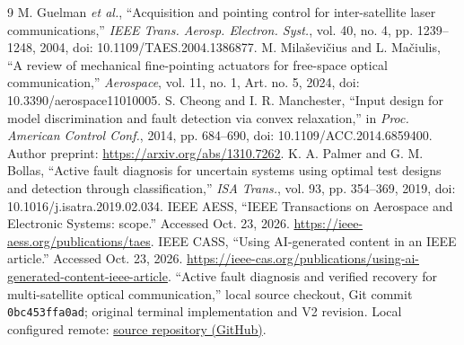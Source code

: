 \documentclass[journal]{IEEEtran}
\begin{document}
\begin{thebibliography}{9}
 M. Guelman \emph{et al.}, ``Acquisition and pointing control for inter-satellite laser communications,'' \emph{IEEE Trans. Aerosp. Electron. Syst.}, vol. 40, no. 4, pp. 1239--1248, 2004, doi: 10.1109/TAES.2004.1386877.
 M. Mila\v{s}evi\v{c}ius and L. Ma\v{c}iulis, ``A review of mechanical fine-pointing actuators for free-space optical communication,'' \emph{Aerospace}, vol. 11, no. 1, Art. no. 5, 2024, doi: 10.3390/aerospace11010005.
 S. Cheong and I. R. Manchester, ``Input design for model discrimination and fault detection via convex relaxation,'' in \emph{Proc. American Control Conf.}, 2014, pp. 684--690, doi: 10.1109/ACC.2014.6859400. Author preprint: \url{https://arxiv.org/abs/1310.7262}.
 K. A. Palmer and G. M. Bollas, ``Active fault diagnosis for uncertain systems using optimal test designs and detection through classification,'' \emph{ISA Trans.}, vol. 93, pp. 354--369, 2019, doi: 10.1016/j.isatra.2019.02.034.
 IEEE AESS, ``IEEE Transactions on Aerospace and Electronic Systems: scope.'' Accessed Oct. 23, 2026. \url{https://ieee-aess.org/publications/taes}.
 IEEE CASS, ``Using AI-generated content in an IEEE article.'' Accessed Oct. 23, 2026. \url{https://ieee-cas.org/publications/using-ai-generated-content-ieee-article}.
 ``Active fault diagnosis and verified recovery for multi-satellite optical communication,'' local source checkout, Git commit \texttt{0bc453ffa0ad}; original terminal implementation and V2 revision. Local configured remote: \href{https://github.com/Rishithachappidi/Active-Fault-Diagnosis-and-Verified-Recovery-for-Multi-Satellite-Optical-Communication}{source repository (GitHub)}.
\end{thebibliography}
\end{document}
